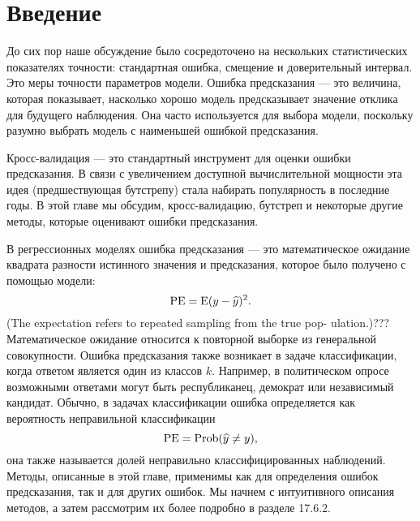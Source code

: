 \section{Введение}
До сих пор наше обсуждение было сосредоточено на нескольких статистических показателях точности: стандартная ошибка, смещение и доверительный интервал. Это меры точности параметров модели. Ошибка предсказания --- это величина, которая показывает, насколько хорошо модель предсказывает значение отклика для будущего наблюдения. Она часто используется для выбора модели, поскольку разумно выбрать модель с наименьшей ошибкой предсказания.

Кросс-валидация --- это стандартный инструмент для оценки ошибки предсказания. В связи с увеличением доступной вычислительной мощности эта идея (предшествующая бутстрепу) стала набирать популярность в последние годы. В этой главе мы обсудим, кросс-валидацию, бутстреп и некоторые другие методы, которые оценивают ошибки предсказания.

В регрессионных моделях ошибка предсказания --- это математическое ожидание квадрата разности истинного значения и предсказания, которое было получено с помощью модели: 
\begin{equation}
\text{PE} = \text{E}(y - \widehat{y})^{2}.
\end{equation}
(The expectation refers to repeated sampling from the true pop- ulation.)???Математическое ожидание относится к повторной выборке из генеральной совокупности. Ошибка предсказания также возникает в задаче классификации, когда ответом является один из классов $k$. Например, в политическом опросе возможными ответами могут быть республиканец, демократ или независимый кандидат. Обычно, в задачах классификации ошибка определяется как вероятность неправильной классификации
\begin{equation}
\text{PE} = \text{Prob}(\widehat{y} \neq y),
\end{equation}
она также называется долей неправильно классифицированных наблюдений. Методы, описанные в этой главе, применимы как для определения ошибок предсказания, так и для других ошибок. Мы начнем с интуитивного описания методов, а затем рассмотрим их более подробно в разделе 17.6.2.
